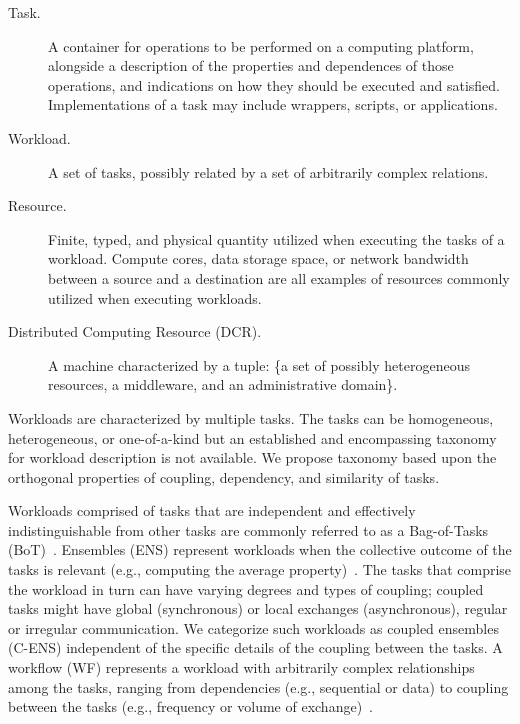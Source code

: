 \documentclass{sig-alternate}
\begin{document}
\begin{description}

\item[Task.] A container for operations to be performed on a computing platform,
alongside a description of the properties and dependences of those operations,
and indications on how they should be executed and satisfied. Implementations of
a task may include wrappers, scripts, or applications.

\item[Workload.] A set of tasks, possibly related by a set of arbitrarily
complex relations.

\item[Resource.] Finite, typed, and physical quantity utilized when executing
the tasks of a workload. Compute cores, data storage space, or network bandwidth
between a source and a destination are all examples of resources commonly
utilized when executing workloads.

\item[Distributed Computing Resource (DCR).] A machine characterized by a tuple:
\{a set of possibly heterogeneous resources, a middleware, and an
administrative domain\}.


\end{description}


Workloads are characterized by multiple tasks. The tasks can be homogeneous,
heterogeneous, or one-of-a-kind but an established and encompassing taxonomy for
workload description is not available. We propose taxonomy based upon the
orthogonal properties of coupling, dependency, and similarity of tasks.

Workloads comprised of tasks that are independent and effectively
indistinguishable from other tasks are commonly referred to as a Bag-of-Tasks
(BoT)~\cite{da2003trading,cirne2003running}. Ensembles (ENS) represent workloads
when the collective outcome of the tasks is relevant (e.g., computing the
average property)~\cite{raicu2008many}. The tasks that comprise the workload in
turn can have varying degrees and types of coupling; coupled tasks might have
global (synchronous) or local exchanges (asynchronous), regular or irregular
communication. We categorize such workloads as coupled ensembles (C-ENS)
independent of the specific details of the coupling between the tasks. A
workflow (WF) represents a workload with arbitrarily complex relationships among
the tasks, ranging from dependencies (e.g., sequential or data) to coupling
between the tasks (e.g., frequency or volume of exchange)~\cite{taylor2014}.
\end{document}
